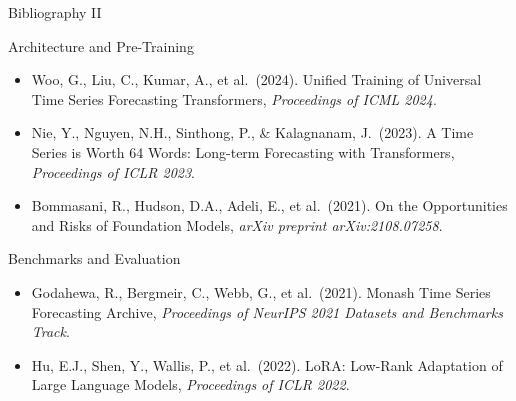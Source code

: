 \documentclass[9pt, aspectratio=169, t]{beamer}
\begin{document}
\begin{frame}{Bibliography II}
    \begin{block}{Architecture and Pre-Training}
        {\footnotesize
        \begin{itemize}\setlength{\itemsep}{0pt}
            \item Woo, G., Liu, C., Kumar, A., et al.\ (2024). Unified Training of Universal Time Series Forecasting Transformers, \textit{Proceedings of ICML 2024}.
            \item Nie, Y., Nguyen, N.H., Sinthong, P., \& Kalagnanam, J.\ (2023). A Time Series is Worth 64 Words: Long-term Forecasting with Transformers, \textit{Proceedings of ICLR 2023}.
            \item Bommasani, R., Hudson, D.A., Adeli, E., et al.\ (2021). On the Opportunities and Risks of Foundation Models, \textit{arXiv preprint arXiv:2108.07258}.
        \end{itemize}
        }
    \end{block}

    \begin{alertblock}{Benchmarks and Evaluation}
        {\footnotesize
        \begin{itemize}\setlength{\itemsep}{0pt}
            \item Godahewa, R., Bergmeir, C., Webb, G., et al.\ (2021). Monash Time Series Forecasting Archive, \textit{Proceedings of NeurIPS 2021 Datasets and Benchmarks Track}.
            \item Hu, E.J., Shen, Y., Wallis, P., et al.\ (2022). LoRA: Low-Rank Adaptation of Large Language Models, \textit{Proceedings of ICLR 2022}.
        \end{itemize}
        }
    \end{alertblock}
\end{frame}
\end{document}
